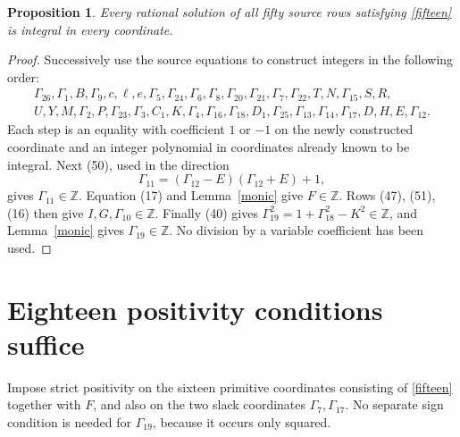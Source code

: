 \documentclass[11pt]{article}
\newtheorem{proposition}[theorem]{Proposition}
\newcommand{\Z}{\mathbb Z}
\begin{document}
\begin{proposition}\label{integral}
Every rational solution of all fifty source rows satisfying
\eqref{fifteen} is integral in every coordinate.
\end{proposition}
\begin{proof}
Successively use the source equations to construct integers in the
following order:
\[
\begin{gathered}
\Gamma_{26},\Gamma_1,B,\Gamma_9,c,\ell,e,\Gamma_5,
\Gamma_{24},\Gamma_6,\Gamma_8,\Gamma_{20},\Gamma_{21},
\Gamma_7,\Gamma_{22},T,N,\Gamma_{15},S,R,\\
U,Y,M,\Gamma_2,P,\Gamma_{23},\Gamma_3,C_1,K,
\Gamma_4,\Gamma_{16},\Gamma_{18},D_1,
\Gamma_{25},\Gamma_{13},\Gamma_{14},\Gamma_{17},D,H,E,\Gamma_{12}.
\end{gathered}
\]
Each step is an equality with coefficient \(1\) or \(-1\) on the newly
constructed coordinate and an integer polynomial in coordinates already
known to be integral. Next (50), used in the direction
\[
\Gamma_{11}=(\Gamma_{12}-E)(\Gamma_{12}+E)+1,
\]
gives \(\Gamma_{11}\in\Z\). Equation (17) and
Lemma~\ref{monic} give \(F\in\Z\). Rows (47), (51), (16) then give
\(I,G,\Gamma_{10}\in\Z\). Finally (40) gives
\(\Gamma_{19}^2=1+\Gamma_{18}^2-K^2\in\Z\), and
Lemma~\ref{monic} gives \(\Gamma_{19}\in\Z\).
No division by a variable coefficient has been used.
\end{proof}

\section{Eighteen positivity conditions suffice}
Impose strict positivity on the sixteen primitive coordinates consisting
of \eqref{fifteen} together with \(F\), and also on the two slack
coordinates \(\Gamma_7,\Gamma_{17}\). No separate sign condition is
needed for \(\Gamma_{19}\), because it occurs only squared.
\end{document}
